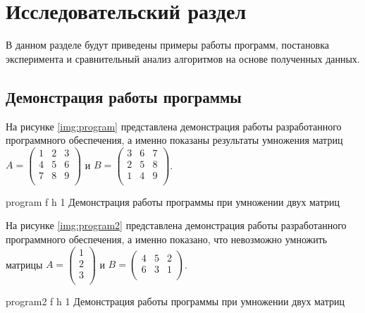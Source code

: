 \chapter{Исследовательский раздел}

В данном разделе будут приведены примеры работы программ, постановка эксперимента и сравнительный анализ алгоритмов на основе полученных данных.

\section{Демонстрация работы программы}


На рисунке \ref{img:program} представлена демонстрация работы разработанного программного обеспечения, а именно показаны результаты умножения матриц $A = \begin{pmatrix}
	1 & 2 & 3\\
	4 & 5 & 6 \\
	7 & 8 & 9\\
\end{pmatrix}$ и $B = \begin{pmatrix}
	3 & 6 & 7\\
	2 & 5 & 8 \\
	1 & 4 & 9 \\
\end{pmatrix}$.  
\clearpage

{program} %
{f} %
{h} %
{1\textwidth} %
{Демонстрация работы программы при умножении двух матриц} %

\clearpage

На рисунке \ref{img:program2} представлена демонстрация работы разработанного программного обеспечения, а именно показано, что невозможно умножить матрицы $A = \begin{pmatrix}
	1 \\
	2 \\
	3 \\
\end{pmatrix}$ и $B = \begin{pmatrix}
	4 & 5 & 2 \\
	6 & 3 & 1 \\
\end{pmatrix}$.  

{program2} %
{f} %
{h} %
{1\textwidth} %
{Демонстрация работы программы при умножении двух матриц} %

